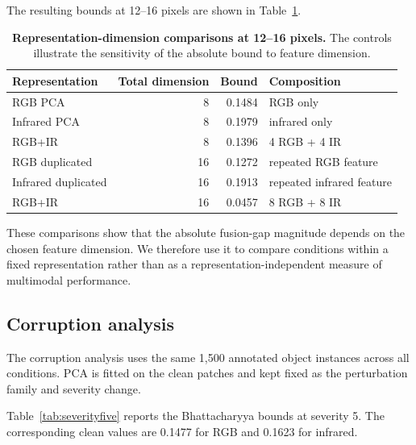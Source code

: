 \documentclass[10pt]{article}
\begin{document}
The resulting bounds at 12--16 pixels are shown in Table~\ref{tab:dimcontrol}.

\begin{table}[h]
\centering
\caption{\textbf{Representation-dimension comparisons at 12--16 pixels.}
The controls illustrate the sensitivity of the absolute bound to feature dimension.}
\label{tab:dimcontrol}
\small
\begin{tabular}{lrrl}
\toprule
Representation & Total dimension & Bound & Composition \\
\midrule
RGB PCA
& 8 & 0.1484 & RGB only \\

Infrared PCA
& 8 & 0.1979 & infrared only \\

RGB+IR
& 8 & 0.1396 & 4 RGB + 4 IR \\

RGB duplicated
& 16 & 0.1272 & repeated RGB feature \\

Infrared duplicated
& 16 & 0.1913 & repeated infrared feature \\

RGB+IR
& 16 & 0.0457 & 8 RGB + 8 IR \\
\bottomrule
\end{tabular}
\end{table}

These comparisons show that the absolute fusion-gap magnitude depends on the chosen feature dimension. We therefore use it to compare conditions within a fixed representation rather than as a representation-independent measure of multimodal performance.

\subsection{Corruption analysis}

The corruption analysis uses the same 1,500 annotated object instances across all conditions. PCA is fitted on the clean patches and kept fixed as the perturbation family and severity change.

Table~\ref{tab:severityfive} reports the Bhattacharyya bounds at severity 5. The corresponding clean values are 0.1477 for RGB and 0.1623 for infrared.
\end{document}
